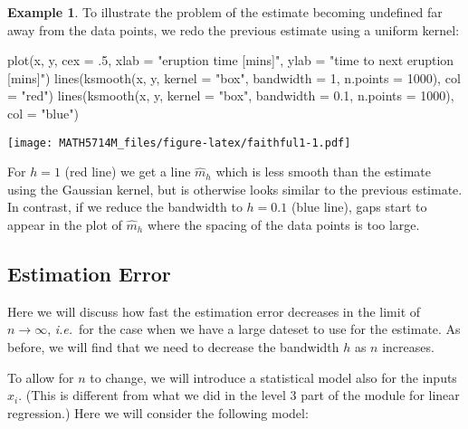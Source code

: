 \documentclass[
  a4paper,
]{article}
\newenvironment{Shaded}{\begin{snugshade}}{\end{snugshade}}
\newcommand{\AttributeTok}[1]{\textcolor[rgb]{0.77,0.63,0.00}{#1}}
\newcommand{\DecValTok}[1]{\textcolor[rgb]{0.00,0.00,0.81}{#1}}
\newcommand{\FloatTok}[1]{\textcolor[rgb]{0.00,0.00,0.81}{#1}}
\newcommand{\FunctionTok}[1]{\textcolor[rgb]{0.00,0.00,0.00}{#1}}
\newcommand{\NormalTok}[1]{#1}
\newcommand{\StringTok}[1]{\textcolor[rgb]{0.31,0.60,0.02}{#1}}
\theoremstyle{definition}
\theoremstyle{definition}
\newtheorem{example}{Example}[section]
\theoremstyle{definition}
\theoremstyle{definition}
\theoremstyle{remark}
\begin{document}
\begin{example}
\protect\hypertarget{exm:faithless}{}\label{exm:faithless}To illustrate the problem of the estimate becoming undefined far away
from the data points, we redo the previous estimate using a uniform
kernel:

\begin{Shaded}
\begin{Highlighting}[]
\FunctionTok{plot}\NormalTok{(x, y, }\AttributeTok{cex =}\NormalTok{ .}\DecValTok{5}\NormalTok{,}
     \AttributeTok{xlab =} \StringTok{"eruption time [mins]"}\NormalTok{, }\AttributeTok{ylab =} \StringTok{"time to next eruption [mins]"}\NormalTok{)}
\FunctionTok{lines}\NormalTok{(}\FunctionTok{ksmooth}\NormalTok{(x, y, }\AttributeTok{kernel =} \StringTok{"box"}\NormalTok{, }\AttributeTok{bandwidth =} \DecValTok{1}\NormalTok{, }\AttributeTok{n.points =} \DecValTok{1000}\NormalTok{),}
      \AttributeTok{col =} \StringTok{"red"}\NormalTok{)}
\FunctionTok{lines}\NormalTok{(}\FunctionTok{ksmooth}\NormalTok{(x, y, }\AttributeTok{kernel =} \StringTok{"box"}\NormalTok{, }\AttributeTok{bandwidth =} \FloatTok{0.1}\NormalTok{, }\AttributeTok{n.points =} \DecValTok{1000}\NormalTok{),}
      \AttributeTok{col =} \StringTok{"blue"}\NormalTok{)}
\end{Highlighting}
\end{Shaded}

\texttt{[image: MATH5714M\_files/figure-latex/faithful1-1.pdf]}

For \(h = 1\) (red line) we get a line \(\hat m_h\) which is less smooth than
the estimate using the Gaussian kernel, but is otherwise looks similar to
the previous estimate. In contrast, if we reduce the bandwidth to \(h = 0.1\)
(blue line), gaps start to appear in the plot of \(\hat m_h\) where the
spacing of the data points is too large.
\end{example}

\hypertarget{estimation-error}{%
\subsection{Estimation Error}\label{estimation-error}}

Here we will discuss how fast the estimation error decreases in the
limit of \(n\to \infty\), \emph{i.e.}~for the case when we have a large dateset
to use for the estimate. As before, we will find that we need to decrease
the bandwidth \(h\) as \(n\) increases.

To allow for \(n\) to change, we will introduce a statistical model
also for the inputs \(x_i\). (This is different from what we did
in the level 3 part of the module for linear regression.) Here
we will consider the following model:
\end{document}
